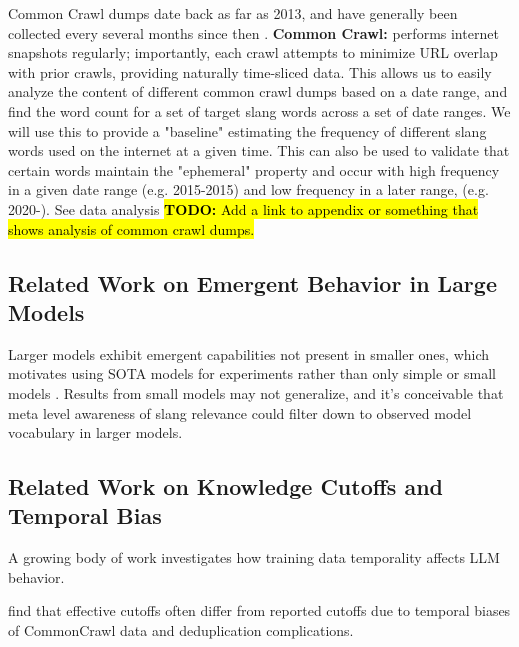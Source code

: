 \documentclass[11pt]{article}
\newcommand{\todo}[1]{\hl{\textbf{TODO:} #1}}
\begin{document}
Common Crawl dumps date back as far as 2013, and have generally been collected every several months since then \cite{commoncrawl2007}.
\textbf{Common Crawl:} performs internet snapshots regularly; importantly, each crawl attempts to minimize URL overlap with prior crawls, providing naturally time-sliced data.
This allows us to easily analyze the content of different common crawl dumps based on a date range, and find the word count for a set of target slang words across a set of date ranges. We will use this to provide a "baseline" estimating the frequency of different slang words used on the internet at a given time. This can also be used to validate that certain words maintain the "ephemeral" property and occur with high frequency in a given date range (e.g. 2015-2015) and low frequency in a later range, (e.g. 2020-). See data analysis \todo{Add a link to appendix or something that shows analysis of common crawl dumps.}



\subsection{Related Work on Emergent Behavior in Large Models}

Larger models exhibit emergent capabilities not present in smaller ones, which motivates using SOTA models for experiments rather than only simple or small models \cite{wei2022emergent}. Results from small models may not generalize, and it's conceivable that meta level awareness of slang relevance could filter down to observed model vocabulary in larger models.

\subsection{Related Work on Knowledge Cutoffs and Temporal Bias}

A growing body of work investigates how training data temporality affects LLM behavior.

\citet{cheng2024dated} find that effective cutoffs often differ from reported cutoffs due to temporal biases of CommonCrawl data and deduplication complications.
\end{document}
